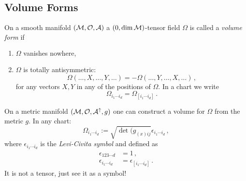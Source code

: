         \subsection{Volume Forms} 
        \begin{defn}
            On a smooth manifold $(\mathcal{M}, \mathcal{O}, \mathcal{A})$ a $(0, \dim \mathcal{M})$-tensor field
            $\Omega$ is called a \textit{volume form} if
            \begin{enumerate}
                \item $\Omega$ vanishes nowhere,
                \item $\Omega$ is totally antisymmetric:
                    \begin{equation}
                        \Omega(\ldots, X, \ldots, Y, \ldots) = - \Omega(\ldots, Y, \ldots, X, \ldots)\,,
                    \end{equation}
                    for any vectors $X, Y$ in any of the positions of $\Omega$.
                    In a chart we write
                    \begin{equation}
                        \Omega_{i_1\cdots i_d} = \Omega_{[i_1\cdots i_d]}\,.
                    \end{equation}
            \end{enumerate}
        \end{defn}

        On a metric manifold $(\mathcal{M}, \mathcal{O}, \mathcal{A}^\uparrow, g)$ one can construct a volume for $\Omega$ from
        the metric $g$.
        In any chart:
        \begin{equation}
            \Omega_{i_1\cdots i_d} := \sqrt{\det(g_{(x)ij}} \epsilon_{i_1\cdots i_d}\,,
            \end{equation}
            where $\epsilon_{i_1\cdots i_d}$ is the \textit{Levi-Civita symbol} and defined as
            \begin{align}
                \epsilon_{123\cdots d} &= 1\,,\\
                \epsilon_{i_1\cdots i_d} &= \epsilon_{[i_1\cdots i_d]}\,.
            \end{align}
            It is not a tensor, just see it as a symbol!

